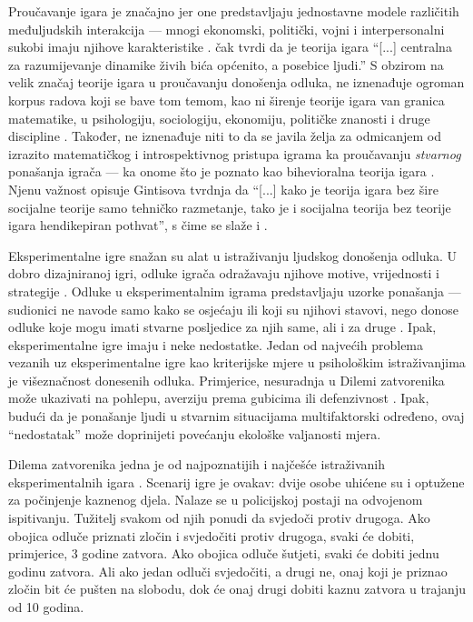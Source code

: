 \documentclass[a4paper, 12pt]{report}
\begin{document}
Proučavanje igara je značajno jer one predstavljaju jednostavne 
modele različitih međuljudskih interakcija
---  mnogi ekonomski, politički, vojni i
interpersonalni sukobi imaju  njihove karakteristike  \citep{worldexgame,colgt}. \citet[str. xiii]{gintbounds} čak
tvrdi da je teorija igara \enquote{[...] centralna za razumijevanje dinamike
    živih bića općenito, a posebice ljudi.} S obzirom na velik značaj teorije
igara u proučavanju donošenja odluka, ne iznenađuje ogroman korpus radova koji
se bave tom temom, kao ni širenje teorije igara van granica matematike, u
psihologiju, sociologiju, ekonomiju, političke znanosti i druge discipline
\citep{vlangsocrev}. Također, ne iznenađuje niti to da se javila želja za
odmicanjem od izrazito matematičkog i introspektivnog pristupa igrama ka
proučavanju \emph{stvarnog} ponašanja igrača --- ka onome što je poznato kao bihevioralna
teorija igara \citep{camerer2003}. Njenu važnost opisuje 
Gintisova \citeyearpar[str. xiii]{gintbounds}  tvrdnja da
\enquote{[...] kako je teorija igara bez šire socijalne teorije samo tehničko
    razmetanje, tako je i socijalna teorija bez teorije igara hendikepiran
    pothvat}, s čime se slaže i \citet[str. ix, par. 2]{colgt}. 

Eksperimentalne igre  snažan su alat u istraživanju ljudskog donošenja odluka. U
dobro dizajniranoj igri, odluke igrača odražavaju njihove motive, vrijednosti
i strategije \citep{worldexgame}. Odluke u eksperimentalnim igrama predstavljaju
uzorke ponašanja --- sudionici ne navode samo kako se osjećaju ili koji su
njihovi stavovi, nego donose odluke koje mogu imati stvarne posljedice za njih
same, ali i za druge \citep{worldexgame}. Ipak, eksperimentalne igre imaju i
neke nedostatke.
Jedan od najvećih problema vezanih uz eksperimentalne igre kao kriterijske mjere
u psihološkim istraživanjima je višeznačnost donesenih odluka.
Primjerice, nesuradnja u Dilemi
zatvorenika može ukazivati na pohlepu, averziju prema gubicima ili defenzivnost
\citep{worldexgame, colgt}. Ipak, budući da je ponašanje ljudi u stvarnim
situacijama multifaktorski određeno, ovaj \enquote{nedostatak} može doprinijeti povećanju
ekološke valjanosti mjera.

Dilema zatvorenika jedna je od najpoznatijih i najčešće istraživanih
eksperimentalnih igara \citep{colgt,
    van1998psychology, vancoop}. Scenarij
igre je ovakav: dvije osobe uhićene su i optužene za počinjenje kaznenog djela.
Nalaze se u policijskoj postaji na odvojenom ispitivanju. Tužitelj svakom od
njih ponudi da svjedoči protiv drugoga. Ako obojica odluče priznati zločin i
svjedočiti protiv drugoga, svaki će dobiti, primjerice, 3 godine zatvora. Ako
obojica odluče šutjeti, svaki će dobiti jednu godinu zatvora. Ali ako jedan
odluči svjedočiti, a drugi ne, onaj koji je priznao zločin bit će pušten na slobodu, dok će
onaj drugi dobiti kaznu zatvora u trajanju od 10 godina.
\end{document}
